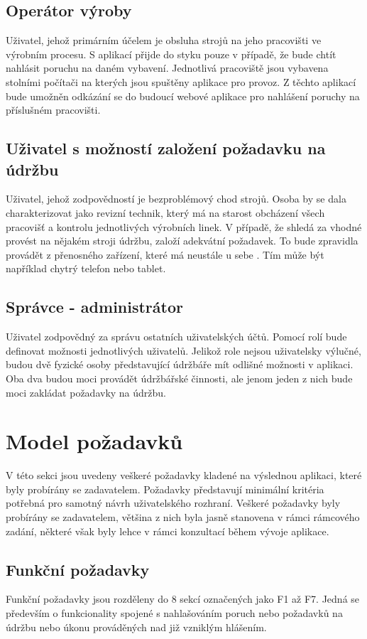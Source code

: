 \documentclass[thesis=M,czech]{FITthesis}[2012/06/26]
\begin{document}
\subsection{Operátor výroby}
Uživatel, jehož primárním účelem je obsluha strojů na jeho pracovišti ve výrobním procesu. S aplikací přijde do styku pouze v případě, že bude chtít nahlásit poruchu na daném vybavení. Jednotlivá pracoviště jsou vybavena stolními počítači na kterých jsou spuštěny aplikace pro provoz. Z těchto aplikací bude umožněn odkázání se do budoucí webové aplikace pro nahlášení poruchy na příslušném pracovišti.
\subsection{Uživatel s možností založení požadavku na údržbu}
Uživatel, jehož zodpovědností je bezproblémový chod strojů. Osoba by se dala charakterizovat jako revizní technik, který má na starost obcházení všech pracovišť a kontrolu jednotlivých výrobních linek. V případě, že shledá za vhodné provést na nějakém stroji údržbu, založí adekvátní požadavek. To bude zpravidla provádět z přenosného zařízení, které má neustále u sebe . Tím může být například chytrý telefon nebo tablet.
\subsection{Správce - administrátor}
Uživatel zodpovědný za správu ostatních uživatelských účtů. Pomocí rolí bude definovat možnosti jednotlivých uživatelů. Jelikož role nejsou uživatelsky výlučné, budou dvě fyzické osoby představující údržbáře mít odlišné možnosti v aplikaci. Oba dva budou moci provádět údržbářské činnosti, ale jenom jeden z nich bude moci zakládat požadavky na údržbu.


\section{Model požadavků}
V této sekci jsou uvedeny veškeré požadavky kladené na výslednou aplikaci, které byly probírány se zadavatelem. Požadavky představují minimální kritéria potřebná pro samotný návrh uživatelského rozhraní. Veškeré požadavky byly probírány se zadavatelem, většina z nich byla jasně stanovena v rámci rámcového zadání, některé však byly lehce v rámci konzultací během vývoje aplikace.

\subsection{Funkční požadavky}
Funkční požadavky jsou rozděleny do 8 sekcí označených jako F1 až F7. Jedná se především o funkcionality spojené s nahlašováním poruch nebo požadavků na údržbu nebo úkonu prováděných nad již vzniklým hlášením. 
\end{document}
